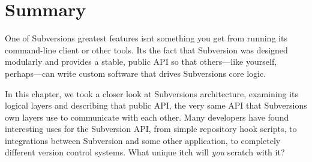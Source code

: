 \section{Summary}\label{svn.developer.summary}

One of Subversion\textquotesingle s greatest features
isn\textquotesingle t something you get from running its command-line
client or other tools. It\textquotesingle s the fact that Subversion was
designed modularly and provides a stable, public API so that
others---like yourself, perhaps---can write custom software that drives
Subversion\textquotesingle s core logic.

In this chapter, we took a closer look at Subversion\textquotesingle s
architecture, examining its logical layers and describing that public
API, the very same API that Subversion\textquotesingle s own layers use
to communicate with each other. Many developers have found interesting
uses for the Subversion API, from simple repository hook scripts, to
integrations between Subversion and some other application, to
completely different version control systems. What unique itch will
\emph{you} scratch with it?


